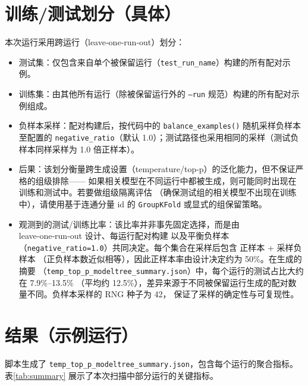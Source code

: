 \documentclass[11pt,a4paper]{article}
\begin{document}
\section{训练/测试划分（具体）}
本次运行采用跨运行（leave‑one‑run‑out）划分：
\begin{itemize}
  \item 测试集：仅包含来自单个被保留运行（\texttt{test\_run\_name}）构建的所有配对示例。
  \item 训练集：由其他所有运行（除被保留运行外的 \texttt{--run} 规范）构建的所有配对示例组成。
  \item 负样本采样：配对构建后，按代码中的 \texttt{balance\_examples()} 随机采样负样本至配置的
    \texttt{negative\_ratio}（默认 1.0）；测试路径也采用相同的采样（测试负样本同样采样为 1.0 倍正样本）。
  \item 后果：该划分衡量跨生成设置（temperature/top‑p）的泛化能力，但不保证严格的组级排除——
    如果相关模型在不同运行中都被生成，则可能同时出现在训练和测试中。若要做组级隔离评估
   （确保测试组的相关模型不出现在训练中），请使用基于连通分量 id 的 \texttt{GroupKFold} 或显式的组保留策略。
  \item 观测到的测试/训练比率：该比率并非事先固定选择，而是由 leave‑one‑run‑out 设计、每运行配对构建
    以及平衡负样本（\texttt{negative\_ratio=1.0}）共同决定。每个集合在采样后包含 正样本 + 采样负样本
   （正负样本数近似相等），因此正样本率由设计决定约为 50\%。在生成的摘要
    （\texttt{temp\_top\_p\_modeltree\_summary.json}）中，每个运行的测试占比大约在 7.9\%–13.5\%
   （平均约 12.5\%），差异来源于不同被保留运行生成的配对数量不同。负样本采样的 RNG 种子为 42，
    保证了采样的确定性与可复现性。
\end{itemize}

\section{结果（示例运行）}
脚本生成了 \texttt{temp\_top\_p\_modeltree\_summary.json}，包含每个运行的聚合指标。
表\ref{tab:summary} 展示了本次扫描中部分运行的关键指标。
\end{document}
